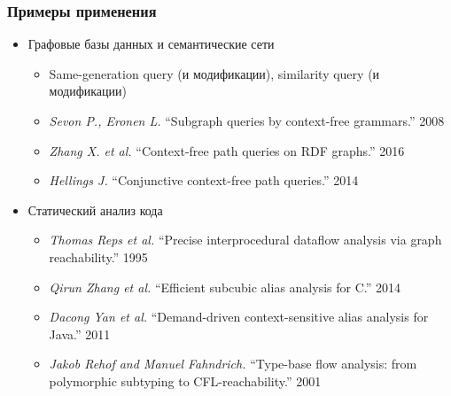 \documentclass[xcolor=table,aspectratio=169]{beamer}
\begin{document}
\begin{frame}[fragile]
  \transwipe[direction=90]
  \frametitle{Примеры применения}
  \begin{itemize}
  \item Графовые базы данных и семантические сети
    \begin{itemize}
        \item Same-generation query (и модификации), similarity query (и модификации)
        \item \emph{Sevon P., Eronen L.} ``Subgraph queries by context-free grammars.'' 2008
        \item \emph{Zhang X. et al.} ``Context-free path queries on RDF graphs.'' 2016
        \item \emph{Hellings J.} ``Conjunctive context-free path queries.'' 2014
    \end{itemize}
    \item Статический анализ кода
    \begin{itemize}
        \item \emph{Thomas Reps et al.} ``Precise interprocedural dataflow analysis via graph reachability.'' 1995 
        \item \emph{Qirun Zhang et al.}  ``Efficient subcubic alias analysis for C.'' 2014
        \item \emph{Dacong Yan et al.} ``Demand-driven context-sensitive alias analysis for Java.'' 2011
        \item \emph{Jakob Rehof and Manuel Fahndrich.} ``Type-base flow analysis: from polymorphic subtyping to CFL-reachability.'' 2001
    \end{itemize}

  \end{itemize}

\end{frame}
\end{document}
